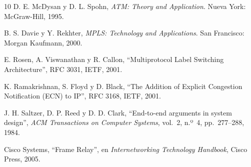 \documentclass[12pt,a4paper]{article}
\begin{document}
\begin{thebibliography}{10}
    D. E. McDysan y D. L. Spohn, \textit{ATM: Theory and Application}. Nueva York: McGraw-Hill, 1995.

    B. S. Davie y Y. Rekhter, \textit{MPLS: Technology and Applications}. San Francisco: Morgan Kaufmann, 2000.

    E. Rosen, A. Viswanathan y R. Callon, ``Multiprotocol Label Switching Architecture'', RFC 3031, IETF, 2001.

    K. Ramakrishnan, S. Floyd y D. Black, ``The Addition of Explicit Congestion Notification (ECN) to IP'', RFC 3168, IETF, 2001.

    J. H. Saltzer, D. P. Reed y D. D. Clark, ``End-to-end arguments in system design'', \textit{ACM Transactions on Computer Systems}, vol.~2, n.º~4, pp.~277--288, 1984.

    Cisco Systems, ``Frame Relay'', en \textit{Internetworking Technology Handbook}, Cisco Press, 2005.
\end{thebibliography}
\end{document}
